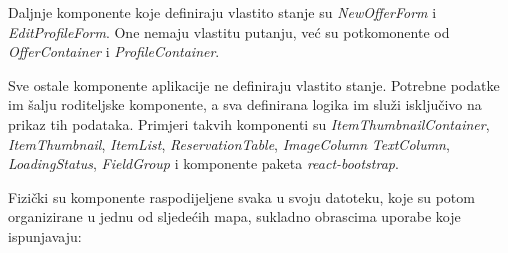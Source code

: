 \documentclass[times, utf8, zavrsni, numeric]{fer}
\newcommand{\razmakp}{\vspace{18pt}}
\begin{document}
\razmakp

Daljnje komponente koje definiraju vlastito stanje su \emph{NewOfferForm} i \emph{EditProfileForm}.
One nemaju vlastitu putanju, već su potkomonente od \emph{OfferContainer} i \emph{ProfileContainer}.

Sve ostale komponente aplikacije ne definiraju vlastito stanje.
Potrebne podatke im šalju roditeljske komponente, a sva definirana logika im služi isključivo na prikaz tih podataka.
Primjeri takvih komponenti su \emph{ItemThumbnailContainer}, \emph{ItemThumbnail}, \emph{ItemList}, \emph{ReservationTable}, \emph{ImageColumn} \emph{TextColumn}, \emph{LoadingStatus}, \emph{FieldGroup} i komponente paketa \emph{react-bootstrap}.

\razmakp
\razmakp

Fizički su komponente raspodijeljene svaka u svoju datoteku, koje su potom organizirane u jednu od sljedećih mapa, sukladno obrascima uporabe koje ispunjavaju:
\end{document}
